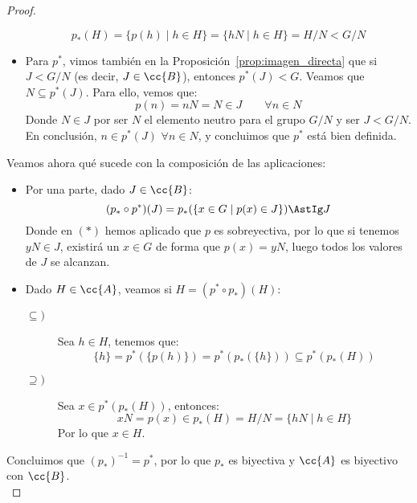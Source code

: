\begin{teo}
\begin{proof}
\begin{itemize}
                \begin{equation*}
                    p_\ast(H) = \{p(h) \mid h \in H\} = \{hN \mid h \in H\} = H/N < G/N
                \end{equation*}
            \item Para $p^\ast$, vimos también en la Proposición~\ref{prop:imagen_directa} que si $J<G/N$ (es decir, $J\in \cc{B}$), entonces $p^\ast(J)<G$. Veamos que $N\subseteq p^\ast(J)$. Para ello, vemos que:
                \begin{equation*}
                    p(n) = nN = N \in J \qquad \forall n\in N
                \end{equation*}
                Donde $N\in J$ por ser $N$ el elemento neutro para el grupo $G/N$ y ser $J < G/N$. En conclusión, $n\in p^\ast(J)$ $\forall n\in N$, y concluimos que $p^\ast$ está bien definida.
        \end{itemize}
        Veamos ahora qué sucede con la composición de las aplicaciones:
        \begin{itemize}
            \item Por una parte, dado $J\in \cc{B}$:
                \begin{equation*}
                    (p_\ast \circ p^\ast)(J) = p_\ast(\{x\in G\mid p(x) \in J\}) \AstIg J
                \end{equation*}
                Donde en $(\ast)$ hemos aplicado que $p$ es sobreyectiva, por lo que si tenemos $yN\in J$, existirá un $x\in G$ de forma que $p(x) = yN$, luego todos los valores de $J$ se alcanzan.
            \item Dado $H\in \cc{A}$, veamos si $H = (p^\ast \circ p_\ast)(H)$:
                \begin{description}
                    \item [$\subseteq)$] Sea $h\in H$, tenemos que:
                        \begin{equation*}
                            \{h\} = p^\ast(\{p(h)\}) = p^\ast(p_\ast(\{h\})) \subseteq p^\ast(p_\ast(H))
                        \end{equation*}
                    \item [$\supseteq)$] Sea $x\in p^\ast(p_\ast(H))$, entonces:
                        \begin{equation*}
                            xN = p(x) \in p_\ast(H) = H/N = \{hN \mid h\in H\}
                        \end{equation*}
                        Por lo que $x\in H$.
                \end{description}
        \end{itemize}
        Concluimos que ${(p_\ast)}^{-1} = p^\ast$, por lo que $p_\ast$ es biyectiva y $\cc{A}$ es biyectivo con $\cc{B}$.\\


\end{proof}
\end{teo}
